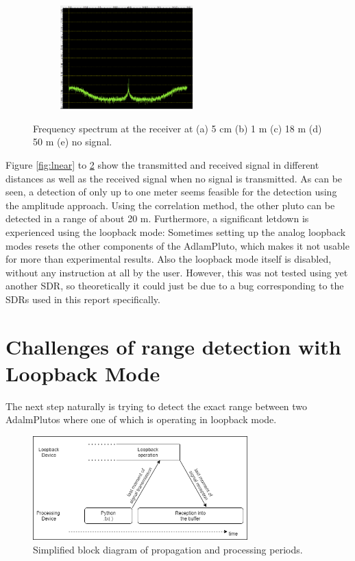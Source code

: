 \documentclass[journal]{IEEEtran}
\begin{document}
\begin{figure}
\begin{subfigure}[b]{0.45\textwidth}
   \includegraphics[width=1\linewidth, height=4cm]{fig/loopback_nosignal.PNG}
   \caption{}
   \label{fig:lnosig} 
\end{subfigure}

\caption{ Frequency spectrum at the receiver at (a) 5 cm (b) 1 m (c) 18 m (d) 50 m (e) no signal.  }
\end{figure}

Figure \ref{fig:lnear} to \ref{fig:lnosig} show the transmitted and received signal in different distances as well as the received signal when no signal is transmitted.
As can be seen, a detection of only up to one meter seems feasible for the detection using the amplitude approach. 
Using the correlation method, the other pluto can be detected in a range of about 20 m.
Furthermore, a significant letdown is experienced using the loopback mode:
Sometimes setting up the analog loopback modes resets the other components of the AdlamPluto, which makes it not usable for more than experimental results. Also the loopback mode itself is disabled, without any instruction at all by the user.
However, this was not tested using yet another SDR, so theoretically it could just be due to a bug corresponding to the SDRs used in this report specifically. 


\section{Challenges of range detection with Loopback Mode}
\label{sec:ChallengeDetection}
The next step naturally is trying to detect the exact range between two AdalmPlutos where one of which is operating in loopback mode.

\begin{figure}
   \includegraphics[width=1\linewidth, height=4cm]{fig/periods_block.png}
   \caption{ Simplified block diagram of propagation and processing periods. }
   \label{fig:block}
\end{figure}
\end{document}
